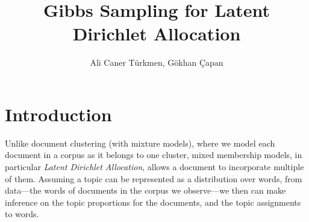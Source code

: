 \documentclass{article}%
\begin{document}
\title{Gibbs Sampling for Latent Dirichlet Allocation}

\author{Ali Caner T\" urkmen, G\" okhan \c Capan}
\date{}



\maketitle





\section{Introduction}
Unlike document clustering (with mixture models), where we model each document in a corpus as it belongs to one cluster, mixed membership models, in particular \textit{Latent Dirichlet Allocation}, allows a document to incorporate multiple of them. Assuming a topic can be represented as a distribution over words, from data---the words of documents in the corpus we observe---we then can make inference on the topic proportions for the documents, and the topic assignments to words.
\end{document}
